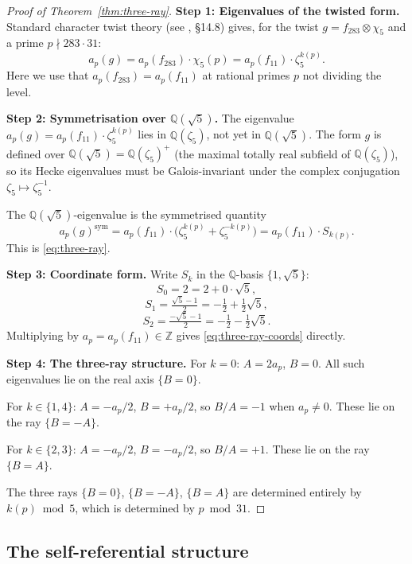 \begin{proof}[Proof of Theorem~\ref{thm:three-ray}]

\textbf{Step 1: Eigenvalues of the twisted form.}
Standard character twist theory (see \cite{IwaniecKowalski}, \S14.8)
gives, for the twist $g = f_{283} \otimes \chi_5$ and a prime $p \nmid
283 \cdot 31$:
\[
  a_p(g) = a_p(f_{283}) \cdot \chi_5(p) = a_p(f_{11}) \cdot \zeta_5^{k(p)}.
\]
Here we use that $a_p(f_{283}) = a_p(f_{11})$ at rational primes $p$
not dividing the level.

\textbf{Step 2: Symmetrisation over $\mathbb{Q}(\sqrt{5})$.}
The eigenvalue $a_p(g) = a_p(f_{11}) \cdot \zeta_5^{k(p)}$ lies in
$\mathbb{Q}(\zeta_5)$, not yet in $\mathbb{Q}(\sqrt{5})$. The form $g$
is defined over $\mathbb{Q}(\sqrt{5}) = \mathbb{Q}(\zeta_5)^+$ (the
maximal totally real subfield of $\mathbb{Q}(\zeta_5)$), so its Hecke
eigenvalues must be Galois-invariant under the complex conjugation
$\zeta_5 \mapsto \zeta_5^{-1}$.

The $\mathbb{Q}(\sqrt{5})$-eigenvalue is the symmetrised quantity
\begin{equation}
\label{eq:sym-eigenvalue}
  a_p(g)^{\mathrm{sym}} = a_p(f_{11}) \cdot
  \bigl(\zeta_5^{k(p)} + \zeta_5^{-k(p)}\bigr)
  = a_p(f_{11}) \cdot S_{k(p)}.
\end{equation}
This is \eqref{eq:three-ray}.

\textbf{Step 3: Coordinate form.}
Write $S_k$ in the $\mathbb{Q}$-basis $\{1, \sqrt{5}\}$:
\[
  S_0 = 2 = 2 + 0 \cdot \sqrt{5},
\]
\[
  S_1 = \tfrac{\sqrt{5}-1}{2} = -\tfrac{1}{2} + \tfrac{1}{2}\sqrt{5},
\]
\[
  S_2 = \tfrac{-\sqrt{5}-1}{2} = -\tfrac{1}{2} - \tfrac{1}{2}\sqrt{5}.
\]
Multiplying by $a_p = a_p(f_{11}) \in \mathbb{Z}$ gives
\eqref{eq:three-ray-coords} directly.

\textbf{Step 4: The three-ray structure.}
For $k=0$: $A = 2a_p$, $B = 0$. All such eigenvalues lie on the real
axis $\{B = 0\}$.

For $k \in \{1,4\}$: $A = -a_p/2$, $B = +a_p/2$, so $B/A = -1$ when
$a_p \neq 0$. These lie on the ray $\{B = -A\}$.

For $k \in \{2,3\}$: $A = -a_p/2$, $B = -a_p/2$, so $B/A = +1$. These
lie on the ray $\{B = A\}$.

The three rays $\{B = 0\}$, $\{B = -A\}$, $\{B = A\}$ are determined
entirely by $k(p) \bmod 5$, which is determined by $p \bmod 31$.
\end{proof}

\subsection{The self-referential structure}
\label{subsec:self-ref}

